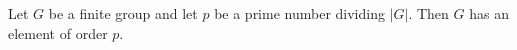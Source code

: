 Let $G$ be a finite group and let $p$ be a prime number dividing $|G|$. Then $G$ has an element of order $p$.
